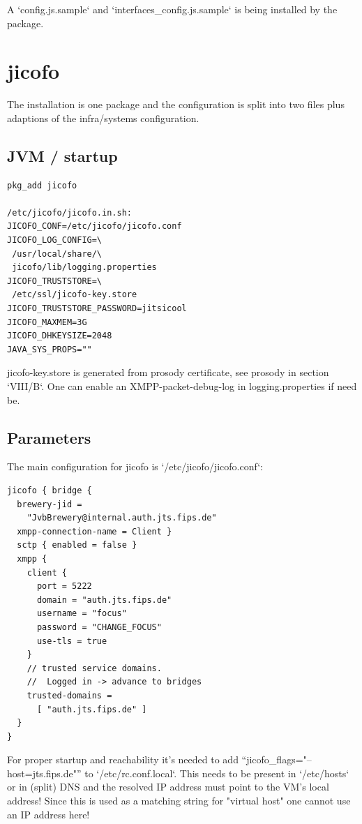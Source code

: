 \documentclass[10pt,conference]{IEEEtran}
\begin{document}
A `config.js.sample` and `interfaces_config.js.sample` is being installed by the package.

\section{jicofo}
The installation is one package and the configuration is split into two files plus
adaptions of the infra/systems configuration.

\subsection{JVM / startup}

\begin{verbatim}
pkg_add jicofo

/etc/jicofo/jicofo.in.sh:
JICOFO_CONF=/etc/jicofo/jicofo.conf
JICOFO_LOG_CONFIG=\
 /usr/local/share/\
 jicofo/lib/logging.properties
JICOFO_TRUSTSTORE=\
 /etc/ssl/jicofo-key.store
JICOFO_TRUSTSTORE_PASSWORD=jitsicool
JICOFO_MAXMEM=3G
JICOFO_DHKEYSIZE=2048
JAVA_SYS_PROPS=""
\end{verbatim}

jicofo-key.store is generated from prosody certificate, see prosody in section `VIII/B`.
One can enable an XMPP-packet-debug-log in logging.properties if need be.

\subsection{Parameters}
The main configuration for jicofo is `/etc/jicofo/jicofo.conf`:

\begin{verbatim}
jicofo { bridge {
  brewery-jid =
    "JvbBrewery@internal.auth.jts.fips.de"
  xmpp-connection-name = Client }
  sctp { enabled = false }
  xmpp {
    client {
      port = 5222
      domain = "auth.jts.fips.de"
      username = "focus"
      password = "CHANGE_FOCUS"
      use-tls = true
    }
    // trusted service domains.
    //  Logged in -> advance to bridges
    trusted-domains =
      [ "auth.jts.fips.de" ]
  }
}
\end{verbatim}

For proper startup and reachability it's needed to add ``jicofo_flags="--host=jts.fips.de"''
to `/etc/rc.conf.local`. This needs to be present in `/etc/hosts` or in (split) DNS and the
resolved IP address must point to the VM's local address! Since this is used as a matching
string for "virtual host" one cannot use an IP address here!
\end{document}

